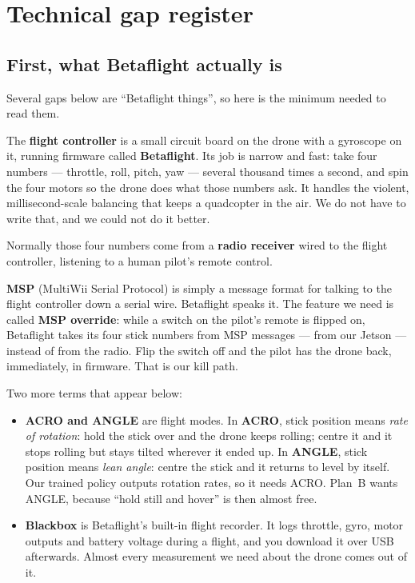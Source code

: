 \section{Technical gap register}\label{sec:gaps}

\subsection{First, what Betaflight actually is}

Several gaps below are ``Betaflight things'', so here is the minimum needed to read them.

\begin{explain}
The \textbf{flight controller} is a small circuit board on the drone with a gyroscope on it, running
firmware called \textbf{Betaflight}. Its job is narrow and fast: take four numbers --- throttle,
roll, pitch, yaw --- several thousand times a second, and spin the four motors so the drone does what
those numbers ask. It handles the violent, millisecond-scale balancing that keeps a quadcopter in
the air. We do not have to write that, and we could not do it better.

Normally those four numbers come from a \textbf{radio receiver} wired to the flight controller,
listening to a human pilot's remote control.

\textbf{MSP} (MultiWii Serial Protocol) is simply a message format for talking to the flight
controller down a serial wire. Betaflight speaks it. The feature we need is called \textbf{MSP
override}: while a switch on the pilot's remote is flipped on, Betaflight takes its four stick
numbers from MSP messages --- from our Jetson --- instead of from the radio. Flip the switch off and
the pilot has the drone back, immediately, in firmware. That is our kill path.

Two more terms that appear below:
\begin{itemize}
\item \textbf{ACRO and ANGLE} are flight modes. In \textbf{ACRO}, stick position means \emph{rate of
rotation}: hold the stick over and the drone keeps rolling; centre it and it stops rolling but stays
tilted wherever it ended up. In \textbf{ANGLE}, stick position means \emph{lean angle}: centre the
stick and it returns to level by itself. Our trained policy outputs rotation rates, so it needs
ACRO. Plan~B wants ANGLE, because ``hold still and hover'' is then almost free.
\item \textbf{Blackbox} is Betaflight's built-in flight recorder. It logs throttle, gyro, motor
outputs and battery voltage during a flight, and you download it over USB afterwards. Almost every
measurement we need about the drone comes out of it.
\end{itemize}
\end{explain}

